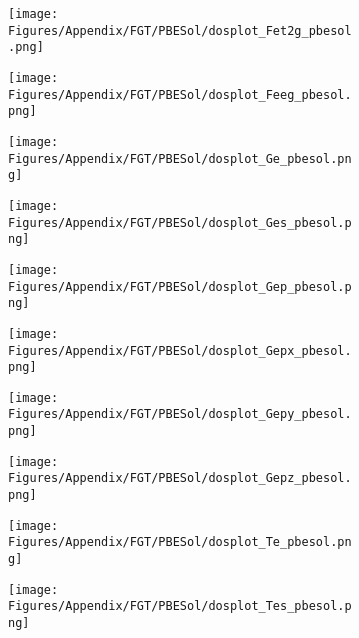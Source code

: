 \begin{figure}[H]
\begin{subfigure}{0.24\textwidth}
\end{subfigure}
\hfill
\begin{subfigure}{0.24\textwidth}
    \texttt{[image: Figures/Appendix/FGT/PBESol/dosplot\_Fet2g\_pbesol.png]}
    \label{dosplot_Fet2g_pbesol}
\end{subfigure}
\hfill
\begin{subfigure}{0.24\textwidth}
    \texttt{[image: Figures/Appendix/FGT/PBESol/dosplot\_Feeg\_pbesol.png]}
    \label{dosplot_Feeg_pbesol}
\end{subfigure}
\hfill
\begin{subfigure}{0.24\textwidth}
    \texttt{[image: Figures/Appendix/FGT/PBESol/dosplot\_Ge\_pbesol.png]}
    \label{dosplot_FeGe_pbesol}
\end{subfigure}
\hfill
\begin{subfigure}{0.24\textwidth}
    \texttt{[image: Figures/Appendix/FGT/PBESol/dosplot\_Ges\_pbesol.png]}
    \label{dosplot_FeGes_pbesol}
\end{subfigure}
\hfill
\begin{subfigure}{0.24\textwidth}
    \texttt{[image: Figures/Appendix/FGT/PBESol/dosplot\_Gep\_pbesol.png]}
    \label{dosplot_FeGep_pbesol}
\end{subfigure}
\hfill
\begin{subfigure}{0.24\textwidth}
    \texttt{[image: Figures/Appendix/FGT/PBESol/dosplot\_Gepx\_pbesol.png]}
    \label{dosplot_FeGepx_pbesol}
\end{subfigure}
\hfill
\begin{subfigure}{0.24\textwidth}
    \texttt{[image: Figures/Appendix/FGT/PBESol/dosplot\_Gepy\_pbesol.png]}
    \label{dosplot_FeGepy_pbesol}
\end{subfigure}
\hfill
\begin{subfigure}{0.24\textwidth}
    \texttt{[image: Figures/Appendix/FGT/PBESol/dosplot\_Gepz\_pbesol.png]}
    \label{dosplot_FeGepz_pbesol}
\end{subfigure}
\hfill
\begin{subfigure}{0.24\textwidth}
    \texttt{[image: Figures/Appendix/FGT/PBESol/dosplot\_Te\_pbesol.png]}
    \label{dosplot_FeTe_pbesol}
\end{subfigure}
\hfill
\begin{subfigure}{0.24\textwidth}
    \texttt{[image: Figures/Appendix/FGT/PBESol/dosplot\_Tes\_pbesol.png]}
    \label{dosplot_FeTes_pbesol}

\end{subfigure}
\end{figure}
